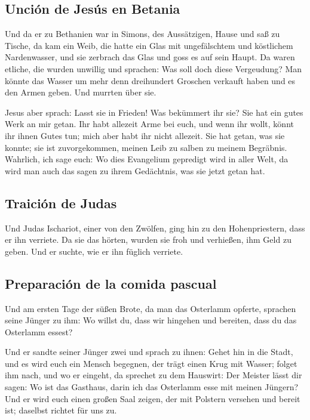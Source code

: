 \hypertarget{unciuxf3n-de-jesuxfas-en-betania}{%
\subsection{Unción de Jesús en
Betania}\label{unciuxf3n-de-jesuxfas-en-betania}}

 Und da er zu Bethanien war in Simons, des Aussätzigen,
Hause und saß zu Tische, da kam ein Weib, die hatte ein Glas mit
ungefälschtem und köstlichem Nardenwasser, und sie zerbrach das Glas und
goss es auf sein Haupt.  Da waren etliche, die wurden
unwillig und sprachen: Was soll doch diese Vergeudung? 
Man könnte das Wasser um mehr denn dreihundert Groschen verkauft haben
und es den Armen geben. Und murrten über sie.

 Jesus aber sprach: Lasst sie in Frieden! Was bekümmert
ihr sie? Sie hat ein gutes Werk an mir getan.  Ihr habt
allezeit Arme bei euch, und wenn ihr wollt, könnt ihr ihnen Gutes tun;
mich aber habt ihr nicht allezeit.  Sie hat getan, was sie
konnte; sie ist zuvorgekommen, meinen Leib zu salben zu meinem
Begräbnis.  Wahrlich, ich sage euch: Wo dies Evangelium
gepredigt wird in aller Welt, da wird man auch das sagen zu ihrem
Gedächtnis, was sie jetzt getan hat.

\hypertarget{traiciuxf3n-de-judas}{%
\subsection{Traición de Judas}\label{traiciuxf3n-de-judas}}

 Und Judas Ischariot, einer von den Zwölfen, ging hin zu
den Hohenpriestern, dass er ihn verriete.  Da sie das
hörten, wurden sie froh und verhießen, ihm Geld zu geben. Und er suchte,
wie er ihn füglich verriete.

\hypertarget{preparaciuxf3n-de-la-comida-pascual}{%
\subsection{Preparación de la comida
pascual}\label{preparaciuxf3n-de-la-comida-pascual}}

 Und am ersten Tage der süßen Brote, da man das Osterlamm
opferte, sprachen seine Jünger zu ihm: Wo willst du, dass wir hingehen
und bereiten, dass du das Osterlamm essest?

 Und er sandte seiner Jünger zwei und sprach zu ihnen:
Gehet hin in die Stadt, und es wird euch ein Mensch begegnen, der trägt
einen Krug mit Wasser; folget ihm nach,  und wo er
eingeht, da sprechet zu dem Hauswirt: Der Meister lässt dir sagen: Wo
ist das Gasthaus, darin ich das Osterlamm esse mit meinen Jüngern?
 Und er wird euch einen großen Saal zeigen, der mit
Polstern versehen und bereit ist; daselbst richtet für uns zu.

